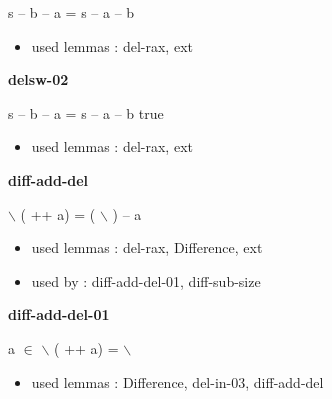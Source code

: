 \documentclass[a4paper]{article}
\begin{document}
\medskip

 \Fol s -- b -- a = s -- a -- b

\begin{itemize}


\item       used lemmas  : del-rax, ext

\end{itemize}

\medskip

\bigskip

{\large\bf delsw-02}

\medskip

 \Fol s -- b -- a = s -- a -- b \Equiv true

\begin{itemize}


\item       used lemmas  : del-rax, ext

\end{itemize}

\medskip

\bigskip

{\large\bf diff-add-del}

\medskip

 \Fol {} $\backslash$ ( ++ a) = ( $\backslash$ ) -- a

\begin{itemize}


\item       used lemmas  : del-rax, Difference, ext
\item       used by      : diff-add-del-01, diff-sub-size

\end{itemize}

\medskip

\bigskip

{\large\bf diff-add-del-01}

\medskip

 \Fol \Not a $\in$  \Imp {} $\backslash$ ( ++ a) =  $\backslash$ 

\begin{itemize}


\item       used lemmas  : Difference, del-in-03, diff-add-del

\end{itemize}

\medskip

\bigskip
\end{document}
